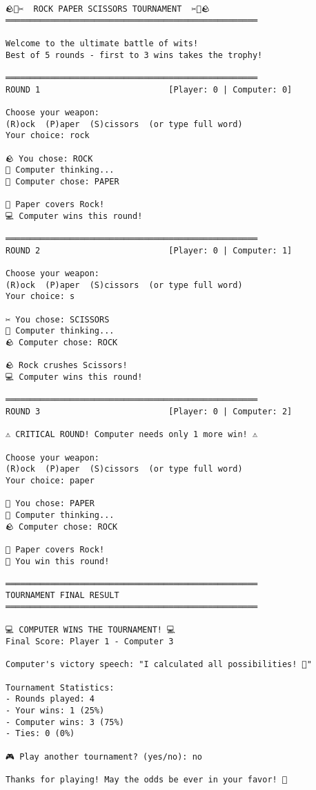 \documentclass[
  letterpaper,
  DIV=11,
  numbers=noendperiod,
  oneside]{scrreprt}
\begin{document}
\begin{verbatim}
🪨📄✂️  ROCK PAPER SCISSORS TOURNAMENT  ✂️📄🪨
═══════════════════════════════════════════════════

Welcome to the ultimate battle of wits!
Best of 5 rounds - first to 3 wins takes the trophy!

═══════════════════════════════════════════════════
ROUND 1                          [Player: 0 | Computer: 0]

Choose your weapon:
(R)ock  (P)aper  (S)cissors  (or type full word)
Your choice: rock

🪨 You chose: ROCK
🔄 Computer thinking...
📄 Computer chose: PAPER

📄 Paper covers Rock!
💻 Computer wins this round!

═══════════════════════════════════════════════════
ROUND 2                          [Player: 0 | Computer: 1]

Choose your weapon:
(R)ock  (P)aper  (S)cissors  (or type full word)
Your choice: s

✂️ You chose: SCISSORS  
🔄 Computer thinking...
🪨 Computer chose: ROCK

🪨 Rock crushes Scissors!
💻 Computer wins this round!

═══════════════════════════════════════════════════
ROUND 3                          [Player: 0 | Computer: 2]

⚠️ CRITICAL ROUND! Computer needs only 1 more win! ⚠️

Choose your weapon:
(R)ock  (P)aper  (S)cissors  (or type full word)
Your choice: paper

📄 You chose: PAPER
🔄 Computer thinking...
🪨 Computer chose: ROCK

📄 Paper covers Rock!
🎉 You win this round!

═══════════════════════════════════════════════════
TOURNAMENT FINAL RESULT
═══════════════════════════════════════════════════

💻 COMPUTER WINS THE TOURNAMENT! 💻
Final Score: Player 1 - Computer 3

Computer's victory speech: "I calculated all possibilities! 🤖"

Tournament Statistics:
- Rounds played: 4
- Your wins: 1 (25%)
- Computer wins: 3 (75%)
- Ties: 0 (0%)

🎮 Play another tournament? (yes/no): no

Thanks for playing! May the odds be ever in your favor! 🎯
\end{verbatim}
\end{document}
